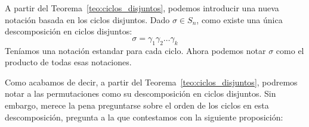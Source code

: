 \begin{notacion}
    A partir del Teorema~\ref{teo:ciclos_disjuntos}, podemos introducir una nueva notación basada en los ciclos disjuntos. Dado $\sigma\in S_n$, como existe una única descomposición en ciclos disjuntos:
    \begin{equation*}
        \sigma=\gamma_1\gamma_2\ldots\gamma_k
    \end{equation*}
    Teníamos una notación estandar para cada ciclo. Ahora podemos notar $\sigma$ como el producto de todas esas notaciones.
\end{notacion}

Como acabamos de decir, a partir del Teorema~\ref{teo:ciclos_disjuntos}, podremos notar a las permutaciones como su descomposición en ciclos disjuntos. Sin embargo, merece la pena preguntarse sobre el orden de los ciclos en esta descomposición, pregunta a la que contestamos con la siguiente proposición:

